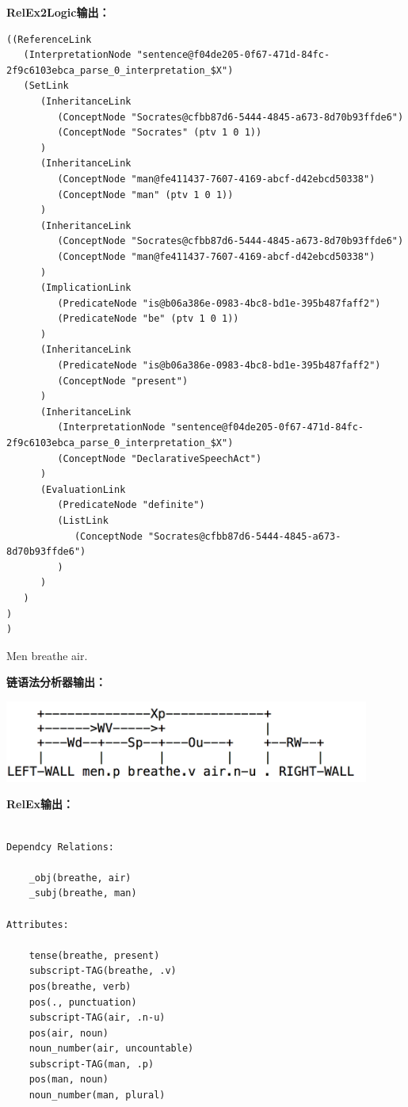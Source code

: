 {\bf RelEx2Logic输出：}

 {\tt\begin{small}\begin{lstlisting}
((ReferenceLink
   (InterpretationNode "sentence@f04de205-0f67-471d-84fc-2f9c6103ebca_parse_0_interpretation_$X")
   (SetLink
      (InheritanceLink
         (ConceptNode "Socrates@cfbb87d6-5444-4845-a673-8d70b93ffde6")
         (ConceptNode "Socrates" (ptv 1 0 1))
      )
      (InheritanceLink
         (ConceptNode "man@fe411437-7607-4169-abcf-d42ebcd50338")
         (ConceptNode "man" (ptv 1 0 1))
      )
      (InheritanceLink
         (ConceptNode "Socrates@cfbb87d6-5444-4845-a673-8d70b93ffde6")
         (ConceptNode "man@fe411437-7607-4169-abcf-d42ebcd50338")
      )
      (ImplicationLink
         (PredicateNode "is@b06a386e-0983-4bc8-bd1e-395b487faff2")
         (PredicateNode "be" (ptv 1 0 1))
      )
      (InheritanceLink
         (PredicateNode "is@b06a386e-0983-4bc8-bd1e-395b487faff2")
         (ConceptNode "present")
      )
      (InheritanceLink
         (InterpretationNode "sentence@f04de205-0f67-471d-84fc-2f9c6103ebca_parse_0_interpretation_$X")
         (ConceptNode "DeclarativeSpeechAct")
      )
      (EvaluationLink
         (PredicateNode "definite")
         (ListLink
            (ConceptNode "Socrates@cfbb87d6-5444-4845-a673-8d70b93ffde6")
         )
      )
   )
)
)
\end{lstlisting}\end{small}}


 Men breathe air.

{\bf 链语法分析器输出：}

\includegraphics[width=12cm]{figures/Socrates_2.png}


{\bf RelEx输出：}

\begin{verbatim}

Dependcy Relations:

    _obj(breathe, air)
    _subj(breathe, man)

Attributes:

    tense(breathe, present)
    subscript-TAG(breathe, .v)
    pos(breathe, verb)
    pos(., punctuation)
    subscript-TAG(air, .n-u)
    pos(air, noun)
    noun_number(air, uncountable)
    subscript-TAG(man, .p)
    pos(man, noun)
    noun_number(man, plural)

\end{verbatim}


